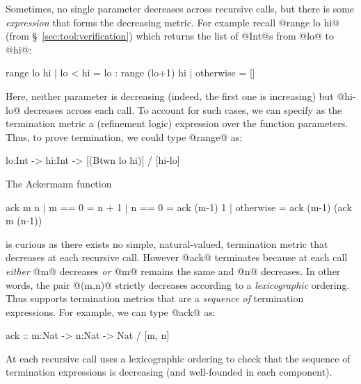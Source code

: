 Sometimes, no single parameter decreases across recursive calls,
but there is some \emph{expression} that forms the decreasing 
metric.
%
For example recall @range lo hi@ (from \S~\ref{sec:tool:verification}) 
which returns the list of @Int@s from @lo@ to @hi@:
%
\begin{code}
  range lo hi 
    | lo < hi   = lo : range (lo+1) hi
    | otherwise = [] 
\end{code}
%
Here, neither parameter is decreasing (indeed, the first 
one is increasing) but @hi-lo@ decreases across each call. 
To account for such cases, we can specify as the termination
metric a (refinement logic) expression over the function
parameters. Thus, to prove termination, we could type @range@ as:
\begin{code}
  lo:Int -> hi:Int -> [(Btwn lo hi)] / [hi-lo]
\end{code}

The Ackermann function
%
\begin{code}
  ack m n 
    | m == 0    = n + 1
    | n == 0    = ack (m-1) 1 
    | otherwise = ack (m-1) (ack m (n-1))
\end{code}
%
is curious as there exists no simple, natural-valued, 
termination metric that decreases at each recursive call.
%
However @ack@ terminates because at each call \emph{either}
@m@ decreases \emph{or} @m@ remains the same and @n@ decreases. 
%
In other words, the pair @(m,n)@ strictly decreases according to a
\emph{lexicographic} ordering. 
%
Thus \toolname supports termination metrics that are a 
\emph{sequence of} termination expressions. For example, 
we can type @ack@ as:
%
\begin{code}
  ack :: m:Nat -> n:Nat -> Nat / [m, n]
\end{code}
%
At each recursive call \toolname uses a lexicographic 
ordering to check that the sequence of termination 
expressions is decreasing (and well-founded in each component).

